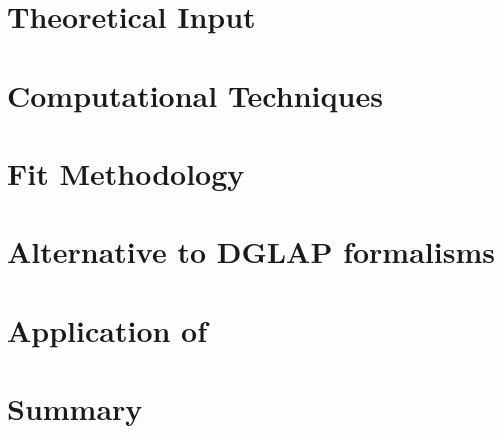 \section{Theoretical Input}
\label{sec:theory}

%
\section{Computational Techniques}
\label{sec:techniques}


\section{Fit Methodology}
\label{sec:method}


\section{Alternative to DGLAP formalisms}
\label{sec:alternative}

\section{Application of \fitter}
\label{sec:examples}



\section{Summary}
\label{sec:outlook}





